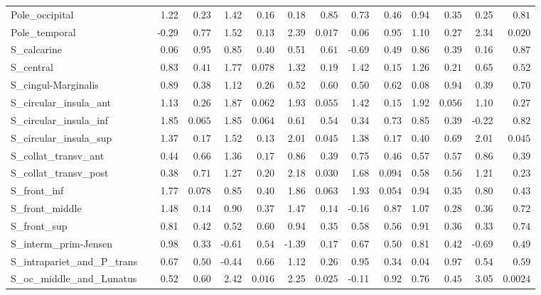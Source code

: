 {\begin{longtable}{llrrrrrrrrrrrr}
Pole\_occipital &  & 1.22 & $0.23$ & 1.42 & $0.16$ & 0.18 & $0.85$ & 0.73 & $0.46$ & 0.94 & $0.35$ & 0.25 & $0.81$ \\
Pole\_temporal &  & -0.29 & $0.77$ & 1.52 & $0.13$ & 2.39 & $0.017$ & 0.06 & $0.95$ & 1.10 & $0.27$ & 2.34 & $0.020$ \\
S\_calcarine &  & 0.06 & $0.95$ & 0.85 & $0.40$ & 0.51 & $0.61$ & -0.69 & $0.49$ & 0.86 & $0.39$ & 0.16 & $0.87$ \\
S\_central &  & 0.83 & $0.41$ & 1.77 & $0.078$ & 1.32 & $0.19$ & 1.42 & $0.15$ & 1.26 & $0.21$ & 0.65 & $0.52$ \\
S\_cingul-Marginalis &  & 0.89 & $0.38$ & 1.12 & $0.26$ & 0.52 & $0.60$ & 0.50 & $0.62$ & 0.08 & $0.94$ & 0.39 & $0.70$ \\
S\_circular\_insula\_ant &  & 1.13 & $0.26$ & 1.87 & $0.062$ & 1.93 & $0.055$ & 1.42 & $0.15$ & 1.92 & $0.056$ & 1.10 & $0.27$ \\
S\_circular\_insula\_inf &  & 1.85 & $0.065$ & 1.85 & $0.064$ & 0.61 & $0.54$ & 0.34 & $0.73$ & 0.85 & $0.39$ & -0.22 & $0.82$ \\
S\_circular\_insula\_sup &  & 1.37 & $0.17$ & 1.52 & $0.13$ & 2.01 & $0.045$ & 1.38 & $0.17$ & 0.40 & $0.69$ & 2.01 & $0.045$ \\
S\_collat\_transv\_ant &  & 0.44 & $0.66$ & 1.36 & $0.17$ & 0.86 & $0.39$ & 0.75 & $0.46$ & 0.57 & $0.57$ & 0.86 & $0.39$ \\
S\_collat\_transv\_post &  & 0.38 & $0.71$ & 1.27 & $0.20$ & 2.18 & $0.030$ & 1.68 & $0.094$ & 0.58 & $0.56$ & 1.21 & $0.23$ \\
S\_front\_inf &  & 1.77 & $0.078$ & 0.85 & $0.40$ & 1.86 & $0.063$ & 1.93 & $0.054$ & 0.94 & $0.35$ & 0.80 & $0.43$ \\
S\_front\_middle &  & 1.48 & $0.14$ & 0.90 & $0.37$ & 1.47 & $0.14$ & -0.16 & $0.87$ & 1.07 & $0.28$ & 0.36 & $0.72$ \\
S\_front\_sup &  & 0.81 & $0.42$ & 0.52 & $0.60$ & 0.94 & $0.35$ & 0.58 & $0.56$ & 0.91 & $0.36$ & 0.33 & $0.74$ \\
S\_interm\_prim-Jensen &  & 0.98 & $0.33$ & -0.61 & $0.54$ & -1.39 & $0.17$ & 0.67 & $0.50$ & 0.81 & $0.42$ & -0.69 & $0.49$ \\
S\_intrapariet\_and\_P\_trans &  & 0.67 & $0.50$ & -0.44 & $0.66$ & 1.12 & $0.26$ & 0.95 & $0.34$ & 0.04 & $0.97$ & 0.54 & $0.59$ \\
S\_oc\_middle\_and\_Lunatus &  & 0.52 & $0.60$ & 2.42 & $0.016$ & 2.25 & $0.025$ & -0.11 & $0.92$ & 0.76 & $0.45$ & 3.05 & $0.0024$ \\

\end{longtable}}
